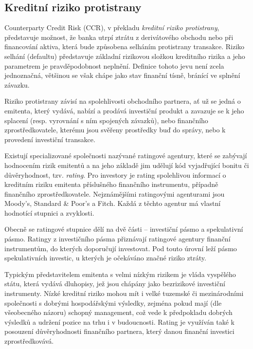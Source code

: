 \documentclass[a4paper,12pt]{report}
\theoremstyle{definition} \newtheorem{definice}[veta]{Definice}
\theoremstyle{remark}
\begin{document}
\subsection{Kreditní riziko protistrany}
Counterparty Credit Risk (CCR), v překladu \textit{kreditní riziko protistrany},  představuje možnost, že banka utrpí ztrátu z derivátového obchodu nebo při financování aktiva, která bude způsobena selháním protistrany transakce. 
Riziko selhání (defaultu) představuje základní rizikovou složkou kreditního rizika a jeho parametrem je pravděpodobnost neplnění. 
Definice tohoto jevu není zcela jednoznačná, většinou se však chápe jako stav finanční tísně, bránící ve splnění závazku.

Riziko protistrany závisí na spolehlivosti obchodního partnera, ať už se jedná o emitenta, který vydává, nabízí a prodává investiční produkt a zavazuje se k jeho splacení (resp. vyrovnání s ním spojených závazků), nebo finančního zprostředkovatele, kterému jsou svěřeny prostředky buď do správy, nebo k provedení investiční transakce.

Existují specializované společnosti nazývané ratingové agentury, které se zabývají hodnocením rizik emitentů %
a na jeho základě jim udělují kód vyjadřující bonitu či důvěryhodnost, tzv. \textit{rating}.
Pro investory je rating spolehlivou informací o kreditním riziku emitenta příslušného finančního instrumentu, případně finančního zprostředkovatele. 
Nejznámějšími ratingovými agenturami jsou Moody's, Standard \& Poor's a Fitch. Každá z těchto agentur má vlastní hodnotící stupnici a zvyklosti.

Obecně se ratingové stupnice dělí na dvě části -- investiční pásmo a spekulativní pásmo.
Ratingy z investičního pásma přiznávají ratingové agentury finanční instrumentům, do kterých doporučují investovat. Pod touto úrovní leží pásmo spekulativních investic, u kterých je očekáváno značné riziko ztráty.

Typickým představitelem emitenta s velmi nízkým rizikem je vláda vyspělého státu, která vydává dluhopisy, jež jsou chápány jako bezrizikové  investiční instrumenty. Nízké kreditní riziko mohou mít i velké tuzemské či mezinárodními společnosti s dobrými hospodářskými výsledky, zejména pokud mají (dle všeobecného názoru) schopný management, což vede k předpokladu dobrých výsledků a udržení pozice na trhu i v budoucnosti.
Rating je využíván také k posouzení  důvěryhodnosti finančního partnera, který danou finanční investici zprostředkovává.
\end{document}
